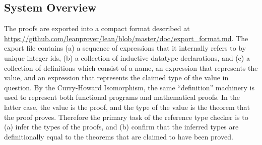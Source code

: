 \documentclass{article}
\begin{document}
\begin{spacing}{1.1}
\section{System Overview}

The proofs are exported into a compact format described at \url{https://github.com/leanprover/lean/blob/master/doc/export_format.md}. The export file contains (a) a sequence of expressions that it internally refers to by unique integer ids, (b) a collection of inductive datatype declarations, and (c) a collection of definitions which consist of a name, an expression that represents the value, and an expression that represents the claimed type of the value in question. By the Curry-Howard Isomorphism, the same ``definition'' machinery is used to represent both functional programs and mathematical proofs. In the latter case, the value is the proof, and the type of the value is the theorem that the proof proves. Therefore the primary task of the reference type checker is to (a) infer the types of the proofs, and (b) confirm that the inferred types are definitionally equal to the theorems that are claimed to have been proved.


\end{spacing}
\end{document}
